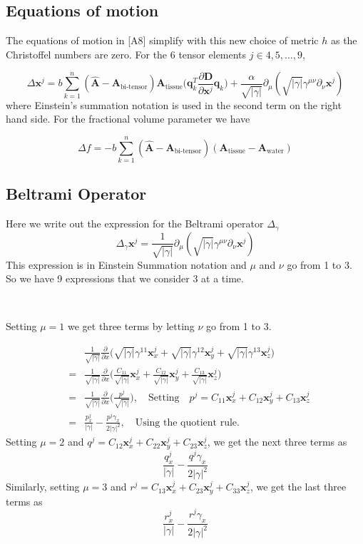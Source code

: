 \documentclass[12pt]{article}
\newcommand{\vect}[1]{\mathbf{#1}}
\newcommand{\detgam}{|\gamma|}
\newcommand{\sqdetgam}{\sqrt{|\gamma|}}
\newcommand{\Ahat}{\hat{\vect{A}}}
\newcommand{\Atissue}{\vect{A}_{\text{tissue}}}
\newcommand{\Awater}{\vect{A}_{\text{water}}}
\newcommand{\Abitensor}{\vect{A}_{\text{bi-tensor}}}
\newcommand{\vx}{\vect{x}}
\newcommand{\pp}[1]{\frac{\partial}{\partial #1}}
\begin{document}
\subsection{Equations of motion}

The equations of motion in \cite{Pasternak2009}[A8] simplify with this new
choice of metric $h$ as the Christoffel numbers are zero. For the 6 tensor
elements $j \in {4, 5, \ldots, 9}$, 

$$\Delta\vect{x}^j = b\sum_{k=1}^n (\Ahat - \Abitensor) \Atissue
\bigg(\vect{q}_k^T\frac{\partial\vect{D}}{\partial\vx^j}\vect{q}_k\bigg) +
\frac{\alpha}{\sqdetgam} \partial_\mu (\sqdetgam \gamma^{\mu \nu} \partial_\nu 
\vx^j)
$$
where Einstein's summation notation is used in the second term on the right
hand side. For the fractional volume parameter we have

$$\Delta f = -b \sum_{k=1}^n (\Ahat - \Abitensor)(\Atissue - \Awater)$$

\subsection{Beltrami Operator}
Here we write out the expression for the Beltrami operator $\Delta_\gamma$
$$\Delta_\gamma \vx^j = \frac{1}{\sqdetgam} \partial_\mu 
    (\sqdetgam \gamma^{\mu \nu} \partial_\nu \vx^j)$$
This expression is in Einstein Summation notation and $\mu$ and $\nu$ go
from 1 to 3. So we have 9 expressions that we consider 3 at a time. 

\ 

\noindent
Setting $\mu = 1$ we get three terms by letting $\nu$ go from 1 to 3.

\begin{eqnarray*}
& &\frac{1}{\sqdetgam} \frac{\partial}{\partial x}
\big(\sqdetgam \gamma^{11} \vx^j_x + 
 \sqdetgam \gamma^{12} \vx^j_y +
 \sqdetgam \gamma^{13} \vx^j_z\big) \\
&=&\frac{1}{\sqdetgam} \frac{\partial}{\partial x}
\bigg(\frac{C_{11}}{\sqdetgam} \vx^j_x + 
      \frac{C_{12}}{\sqdetgam} \vx^j_y +
      \frac{C_{13}}{\sqdetgam} \vx^j_z \bigg) \\
&=& \frac{1}{\sqdetgam} \pp{x} \bigg( \frac{p^j}{\sqdetgam} \bigg), 
      \quad\text{Setting}\quad 
      p^j = C_{11}\vx^j_x + C_{12}\vx^j_y + C_{13}\vx^j_z\\
&=& \frac{p^j_x}{\detgam} - \frac{p^j \gamma_x}{2\detgam^2}, 
      \quad\text{Using the quotient rule.}
\end{eqnarray*}
\noindent 
Setting $\mu = 2$ and $q^j = C_{12}\vx^j_x + C_{22}\vx^j_y + C_{23}\vx^j_z$, we get the next three terms as
$$ \frac{q^j_x}{\detgam} - \frac{q^j \gamma_x}{2\detgam^2}$$
\noindent 
Similarly, setting $\mu = 3$ and $r^j = C_{13}\vx^j_x + C_{23}\vx^j_y + C_{33}\vx^j_z$, we get the last three terms as
$$ \frac{r^j_x}{\detgam} - \frac{r^j \gamma_x}{2\detgam^2}$$
\end{document}
